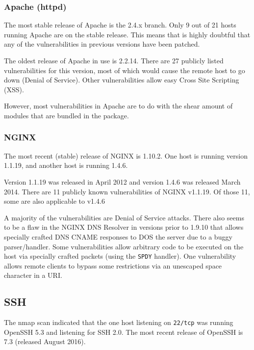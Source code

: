 \documentclass[a4paper]{article}
\begin{document}
\subsubsection{Apache (httpd)}
The most stable release of Apache is the 2.4.x branch.
Only 9 out of 21 hosts running Apache are on the stable release.
This means that is highly doubtful that any of the vulnerabilities in previous versions have been patched.

The oldest release of Apache in use is 2.2.14.
There are 27 publicly listed vulnerabilities for this version, most of which would cause the remote host to go down (Denial of Service).
Other vulnerabilities allow easy Cross Site Scripting (XSS).

However, most vulnerabilities in Apache are to do with the shear amount of modules that are bundled in the package.


\subsubsection{NGINX}
The most recent (stable) release of NGINX is 1.10.2.
One host is running version 1.1.19, and another host is running 1.4.6.

Version 1.1.19 was released in April 2012 and version 1.4.6 was released March 2014.
There are 11 publicly known vulnerabilities of NGINX v1.1.19.
Of those 11, some are also applicable to v1.4.6

A majority of the vulnerabilities are Denial of Service attacks.
There also seems to be a flaw in the NGINX DNS Resolver in versions prior to 1.9.10 that allows specially crafted DNS CNAME responses to DOS the server due to a buggy parser/handler.
Some vulnerabilities allow arbitrary code to be executed on the host via specially crafted packets (using the \texttt{SPDY} handler).
One vulnerability allows remote clients to bypass some restrictions via an unescaped space character in a URI.

\subsection{SSH}
The nmap scan indicated that the one host listening on \texttt{22/tcp} was running OpenSSH 5.3 and listening for SSH 2.0.
The most recent release of OpenSSH is 7.3 (released August 2016).
\end{document}
